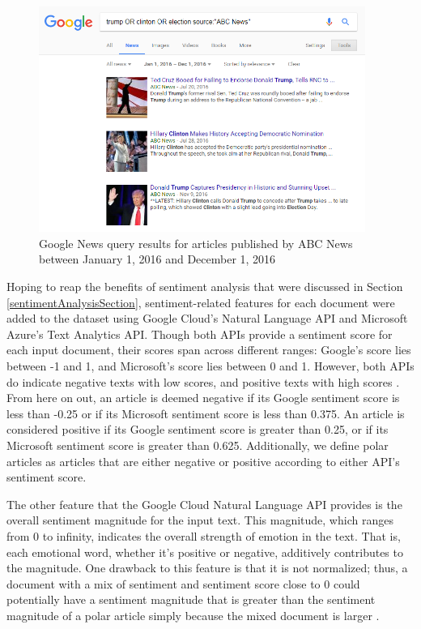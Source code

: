 \begin{figure}[h]
\centering
\captionsetup{justification=centering,width=0.95\textwidth}
\centerline{\includegraphics[width=0.95\textwidth]{googlenews.png}}
\caption[ABC News Articles On Google News]{
    Google News query results for articles published by ABC News between January 1, 2016 and December 1, 2016
}
\label{fig:googlenews}
\end{figure}


Hoping to reap the benefits of sentiment analysis that were discussed in Section \ref{sentimentAnalysisSection}, sentiment-related features for each document were added to the dataset using Google Cloud's Natural Language API and Microsoft Azure's Text Analytics API.  Though both APIs provide a sentiment score for each input document, their scores span across different ranges: Google's score lies between -1 and 1, and Microsoft's score lies between 0 and 1.  However, both APIs do indicate negative texts with low scores, and positive texts with high scores \cite{googleSentiment,microsoftSentiment}.  From here on out, an article is deemed negative if its Google sentiment score is less than -0.25 or if its Microsoft sentiment score is less than 0.375.  An article is considered positive if its Google sentiment score is greater than 0.25, or if its Microsoft sentiment score is greater than 0.625.  Additionally, we define polar articles as articles that are either negative or positive according to either API's sentiment score.

The other feature that the Google Cloud Natural Language API provides is the overall sentiment magnitude for the input text.  This magnitude, which ranges from 0 to infinity, indicates the overall strength of emotion in the text.  That is, each emotional word, whether it's positive or negative, additively contributes to the magnitude.  One drawback to this feature is that it is not normalized; thus, a document with a mix of sentiment and sentiment score close to 0 could potentially have a sentiment magnitude that is greater than the sentiment magnitude of a polar article simply because the mixed document is larger \cite{googleSentiment}.

